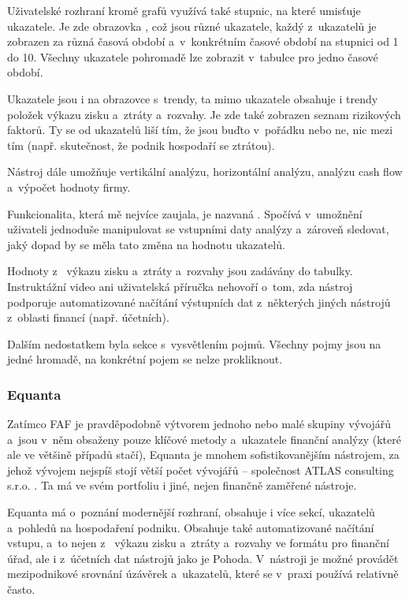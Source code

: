Uživatelské rozhraní kromě grafů využívá také stupnic, na které umisťuje ukazatele. Je zde obrazovka , což jsou různé ukazatele, každý z~ukazatelů je zobrazen za různá časová období a~v~konkrétním časové období na stupnici od 1 do 10. Všechny ukazatele pohromadě lze zobrazit v~tabulce pro jedno časové období.

Ukazatele jsou i na obrazovce s~trendy, ta mimo ukazatele obsahuje i trendy položek výkazu zisku a~ztráty a~rozvahy. Je zde také zobrazen seznam rizikových faktorů. Ty se od ukazatelů liší tím, že jsou buďto v~pořádku nebo ne, nic mezi tím (např. skutečnost, že podnik hospodaří se ztrátou).

Nástroj dále umožňuje vertikální analýzu, horizontální analýzu, analýzu cash flow a~výpočet hodnoty firmy.

Funkcionalita, která mě nejvíce zaujala, je nazvaná . Spočívá v~umožnění uživateli jednoduše manipulovat se vstupními daty analýzy a~zároveň sledovat, jaký dopad by se měla tato změna na hodnotu ukazatelů.

Hodnoty z~ výkazu zisku a~ztráty a~rozvahy jsou zadávány do tabulky. Instruktážní video ani uživatelská příručka nehovoří o~tom, zda nástroj podporuje automatizované načítání výstupních dat z~některých jiných nástrojů z~oblasti financí (např. účetních).

Dalším nedostatkem byla sekce s~vysvětlením pojmů. Všechny pojmy jsou na jedné hromadě, na konkrétní pojem se nelze prokliknout.


\subsubsection{Equanta}
Zatímco FAF je pravděpodobně výtvorem jednoho nebo malé skupiny vývojářů a~jsou v~něm obsaženy pouze klíčové metody a~ukazatele finanční analýzy (které ale ve většině případů stačí), Equanta je mnohem sofistikovanějším nástrojem, za jehož vývojem nejspíš stojí větší počet vývojářů -- společnost ATLAS consulting s.r.o. . Ta má ve svém portfoliu i jiné, nejen finančně zaměřené nástroje.

Equanta má o~poznání modernější rozhraní, obsahuje i více sekcí, ukazatelů a~pohledů na hospodaření podniku. Obsahuje také automatizované načítání vstupu, a~to nejen z~ výkazu zisku a~ztráty a~rozvahy ve formátu pro finanční úřad, ale i z~účetních dat nástrojů jako je Pohoda. V~nástroji je možné provádět mezipodnikové srovnání úzávěrek a~ukazatelů, které se v~praxi používá relativně často.

